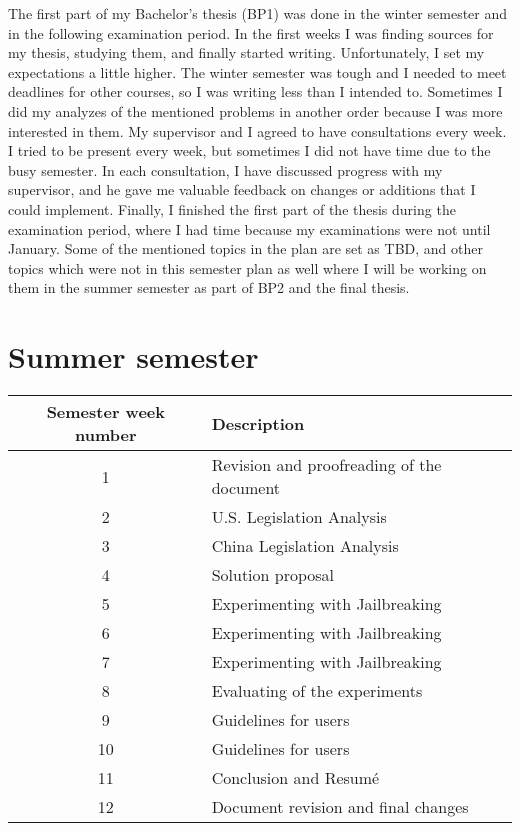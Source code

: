 The first part of my Bachelor's thesis (BP1) was done in the winter semester and in the following examination period. In the first weeks I was finding sources for my thesis, studying them, and finally started writing. Unfortunately, I set my expectations a little higher. The winter semester was tough and I needed to meet deadlines for other courses, so I was writing less than I intended to. Sometimes I did my analyzes of the mentioned problems in another order because I was more interested in them. My supervisor and I agreed to have consultations every week. I tried to be present every week, but sometimes I did not have time due to the busy semester. In each consultation, I have discussed progress with my supervisor, and he gave me valuable feedback on changes or additions that I could implement. Finally, I finished the first part of the thesis during the examination period, where I had time because my examinations were not until January. Some of the mentioned topics in the plan are set as TBD, and other topics which were not in this semester plan as well where I will be working on them in the summer semester as part of BP2 and the final thesis.


\newpage


\section{Summer semester}

\begin{table}[hp]
    \centering
    \begin{tabular}{|c|l|}
    \hline
    \textbf{Semester week number} & \textbf{Description} \\ \hline

    1 & Revision and proofreading of the document \\ \hline
    2 & U.S. Legislation Analysis \\ \hline
    3 & China Legislation Analysis \\ \hline
    4 & Solution proposal \\ \hline
    5 & Experimenting with Jailbreaking \\ \hline
    6 & Experimenting with Jailbreaking \\ \hline
    7 & Experimenting with Jailbreaking \\ \hline
    8 & Evaluating of the experiments \\ \hline
    9 & Guidelines for users \\ \hline
    10 & Guidelines for users \\ \hline
    11 & Conclusion and Resumé \\ \hline
    12 & Document revision and final changes \\ \hline
    \end{tabular}
\end{table}

